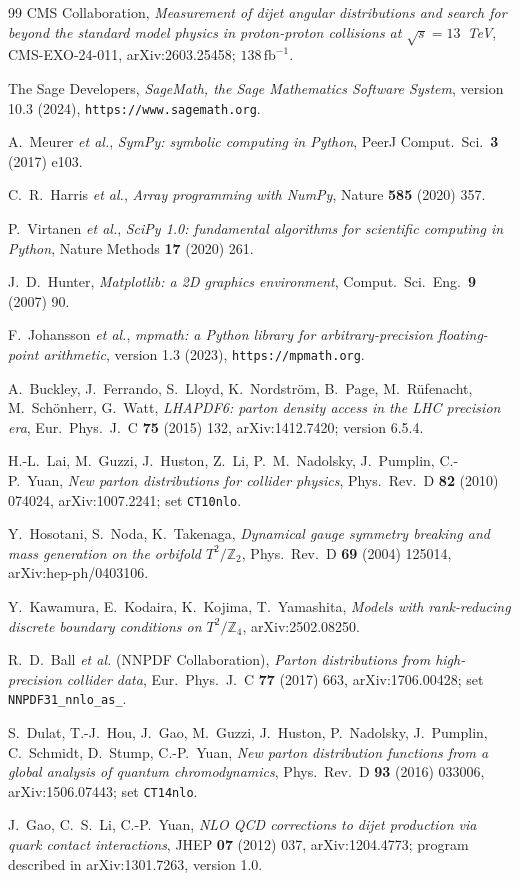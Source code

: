 \documentclass[11pt,a4paper]{article}
\newcommand{\ZZ}{\mathbb{Z}}
\begin{document}
\begin{thebibliography}{99}
 CMS Collaboration, \emph{Measurement of dijet angular distributions and search for beyond the standard model physics in proton-proton collisions at $\sqrt{s}=13$~TeV}, CMS-EXO-24-011, arXiv:2603.25458; $138\,\mathrm{fb}^{-1}$.

 The Sage Developers, \emph{SageMath, the Sage Mathematics Software System}, version 10.3 (2024), \texttt{https://www.sagemath.org}.

 A.~Meurer \emph{et al.}, \emph{SymPy: symbolic computing in Python}, PeerJ Comput.\ Sci.\ \textbf{3} (2017) e103.

 C.~R.~Harris \emph{et al.}, \emph{Array programming with NumPy}, Nature \textbf{585} (2020) 357.

 P.~Virtanen \emph{et al.}, \emph{SciPy 1.0: fundamental algorithms for scientific computing in Python}, Nature Methods \textbf{17} (2020) 261.

 J.~D.~Hunter, \emph{Matplotlib: a 2D graphics environment}, Comput.\ Sci.\ Eng.\ \textbf{9} (2007) 90.

 F.~Johansson \emph{et al.}, \emph{mpmath: a Python library for arbitrary-precision floating-point arithmetic}, version 1.3 (2023), \texttt{https://mpmath.org}.

 A.~Buckley, J.~Ferrando, S.~Lloyd, K.~Nordstr\"om, B.~Page, M.~R\"ufenacht, M.~Sch\"onherr, G.~Watt, \emph{LHAPDF6: parton density access in the LHC precision era}, Eur.\ Phys.\ J.\ C \textbf{75} (2015) 132, arXiv:1412.7420; version 6.5.4.

 H.-L.~Lai, M.~Guzzi, J.~Huston, Z.~Li, P.~M.~Nadolsky, J.~Pumplin, C.-P.~Yuan, \emph{New parton distributions for collider physics}, Phys.\ Rev.\ D \textbf{82} (2010) 074024, arXiv:1007.2241; set \texttt{CT10nlo}.

 Y.~Hosotani, S.~Noda, K.~Takenaga, \emph{Dynamical gauge symmetry breaking and mass generation on the orbifold $T^2/\ZZ_2$}, Phys.\ Rev.\ D \textbf{69} (2004) 125014, arXiv:hep-ph/0403106.

 Y.~Kawamura, E.~Kodaira, K.~Kojima, T.~Yamashita, \emph{Models with rank-reducing discrete boundary conditions on $T^2/\ZZ_4$}, arXiv:2502.08250.

 R.~D.~Ball \emph{et al.} (NNPDF Collaboration), \emph{Parton distributions from high-precision collider data}, Eur.\ Phys.\ J.\ C \textbf{77} (2017) 663, arXiv:1706.00428; set \texttt{NNPDF31\_\allowbreak nnlo\_\allowbreak as\_}.

 S.~Dulat, T.-J.~Hou, J.~Gao, M.~Guzzi, J.~Huston, P.~Nadolsky, J.~Pumplin, C.~Schmidt, D.~Stump, C.-P.~Yuan, \emph{New parton distribution functions from a global analysis of quantum chromodynamics}, Phys.\ Rev.\ D \textbf{93} (2016) 033006, arXiv:1506.07443; set \texttt{CT14nlo}.

 J.~Gao, C.~S.~Li, C.-P.~Yuan, \emph{NLO QCD corrections to dijet production via quark contact interactions}, JHEP \textbf{07} (2012) 037, arXiv:1204.4773; program described in arXiv:1301.7263, version 1.0.

\end{thebibliography}
\end{document}
